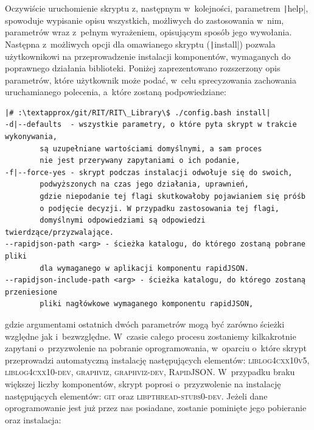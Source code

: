 Oczywiście uruchomienie skryptu z, następnym w~kolejności, parametrem \texttt|help|, spowoduje wypisanie opisu wszystkich, możliwych do zastosowania w~nim, parametrów wraz z~pełnym wyrażeniem, opisującym sposób jego wywołania. Następna z~możliwych opcji dla omawianego skryptu (\texttt|install|) pozwala użytkownikowi na przeprowadzenie instalacji komponentów, wymaganych do poprawnego działania biblioteki. Poniżej zaprezentowano rozszerzony opis parametrów, które użytkownik może podać, w~celu sprecyzowania zachowania uruchamianego polecenia, a~które zostaną podpowiedziane:
\begin{verbatim}
|# :\textapprox/git/RIT/RIT\_Library\$ ./config.bash install|
-d|--defaults  - wszystkie parametry, o które pyta skrypt w trakcie wykonywania, 
		są uzupełniane wartościami domyślnymi, a sam proces 
		nie jest przerywany zapytaniami o ich podanie,
-f|--force-yes - skrypt podczas instalacji odwołuje się do swoich, 
		podwyższonych na czas jego działania, uprawnień, 
		gdzie niepodanie tej flagi skutkowałoby pojawianiem się próśb 
		o podjęcie decyzji. W przypadku zastosowania tej flagi, 
		domyślnymi odpowiedziami są odpowiedzi twierdzące/przyzwalające.
--rapidjson-path <arg> - ścieżka katalogu, do którego zostaną pobrane pliki 
		dla wymaganego w aplikacji komponentu rapidJSON.
--rapidjson-include-path <arg> - ścieżka katalogu, do którego zostaną przeniesione 
		pliki nagłówkowe wymaganego komponentu rapidJSON,
\end{verbatim}
gdzie argumentami ostatnich dwóch parametrów mogą być zarówno ścieżki względne jak i~bezwzględne. W~czasie całego procesu zostaniemy kilkakrotnie zapytani o~przyzwolenie na pobranie oprogramowania, w~oparciu o~które skrypt przeprowadzi automatyczną  instalację następujących elementów: \textsc{liblog4cxx10v5}, \textsc{liblog4cxx10-dev}, \textsc{graphviz}, \textsc{graphviz-dev}, \textsc{RapidJSON}. W~przypadku braku większej liczby komponentów, skrypt poprosi o~przyzwolenie na instalację następujących elementów: \textsc{git} oraz \textsc{libpthread-stubs0-dev}. Jeżeli dane oprogramowanie jest już przez nas posiadane, zostanie pominięte jego pobieranie oraz instalacja:

